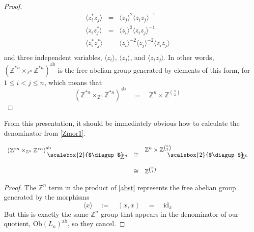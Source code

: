 \documentclass{amsbook} %
\newcommand{\id}{\textrm{id}}
\newcommand{\bigquotient}[2]{ \raisebox{0.75\height}{$#1$} \mkern-12mu\scalebox{2}{$\diagup$}\mkern-10mu \raisebox{-0.5\height}{$#2$} }
\numberwithin{section}{chapter}
\begin{document}
\begin{proof}
\[\begin{array}{rll}
			\langle z_i^* z_j \rangle & = & \langle z_j \rangle^2 \langle z_i z_j \rangle^{-1} \\
			\langle z_i z_j^* \rangle & = & \langle z_i \rangle^2 \langle z_i z_j \rangle^{-1} \\
			\langle z_i^* z_j^* \rangle & = & \langle z_i \rangle^{-2} \langle z_j \rangle^{-2} \langle z_i z_j \rangle \\
		\end{array}
\]
and three independent variables, $\langle z_i \rangle$, $\langle z_j \rangle$, and $\langle z_i z_j \rangle$. In other words, $(\mathbb{Z}^{\ast n} \times_{\mathbb{Z}^n} \mathbb{Z}^{\ast n})^{\mathrm{ab}}$ is the free abelian group generated by elements of this form, for $1 \le i < j \le n$, which means that
\[ (\mathbb{Z}^{\ast n} \times_{\mathbb{Z}^n} \mathbb{Z}^{\ast n})^{\mathrm{ab}} \quad = \quad \mathbb{Z}^n \times \mathbb{Z}^{{n}\choose{2}} \]
\end{proof}

From this presentation, it should be immediately obvious how to calculate the denominator from \cref{Zmor1}.

\begin{cor} \label{nchoose2}
\[ \begin{array}{rll}
			 \bigquotient{{(\mathbb{Z}^{\ast n} \times_{\mathbb{Z}^n} \mathbb{Z}^{\ast n})}^{\mathrm{ab}}}{\mathbb{Z}^n} & \cong & \bigquotient{\mathbb{Z}^n \times \mathbb{Z}^{{n}\choose{2}}}{\mathbb{Z}^n} \\[\bigskipamount]
			& \cong & \mathbb{Z}^{{n}\choose{2}} 
		\end{array}
\]
\end{cor}
\begin{proof}
The $\mathbb{Z}^n$ term in the product of \cref{abst} represents the free abelian group generated by the morphisms
\[ \langle x \rangle \quad := \quad (x,x) \quad = \quad \id_{x} \]
But this is exactly the same $\mathbb{Z}^n$ group that appears in the denominator of our quotient, $\mathrm{Ob}(L_n)^{\mathrm{ab}}$, so they cancel.
\end{proof}

\end{document}
